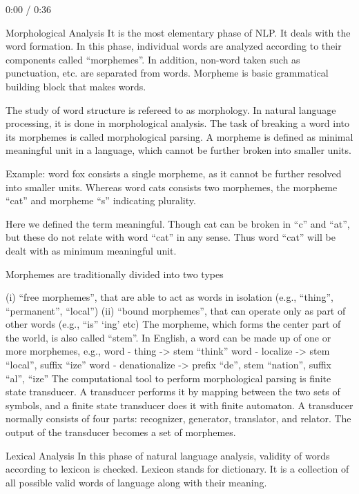 0:00
/ 0:36



Morphological Analysis
It is the most elementary phase of NLP. It deals with the word formation. In this phase, individual words are analyzed according to their components called “morphemes”. In addition, non-word taken such as punctuation, etc. are separated from words. Morpheme is basic grammatical building block that makes words.



The study of word structure is refereed to as morphology. In natural language processing, it is done in morphological analysis. The task of breaking a word into its morphemes is called morphological parsing. A morpheme is defined as minimal meaningful unit in a language, which cannot be further broken into smaller units.

Example: word fox consists a single morpheme, as it cannot be further resolved into smaller units. Whereas word cats consists two morphemes, the morpheme “cat” and morpheme “s” indicating plurality.

Here we defined the term meaningful. Though cat can be broken in “c” and “at”, but these do not relate with word “cat” in any sense. Thus word “cat” will be dealt with as minimum meaningful unit.

Morphemes are traditionally divided into two types

(i) “free morphemes”, that are able to act as words in isolation (e.g., “thing”, “permanent”, “local”)
(ii) “bound morphemes”, that can operate only as part of other words (e.g., “is” ‘ing’ etc) The morpheme, which forms the center part of the world, is also called “stem”. In English, a word can be made up of one or more morphemes, e.g.,
word - thing           -> stem “think”
word - localize        -> stem “local”, suffix “ize”
word - denationalize   -> prefix “de”, stem “nation”, suffix “al”, “ize”
The computational tool to perform morphological parsing is finite state transducer. A transducer performs it by mapping between the two sets of symbols, and a finite state transducer does it with finite automaton. A transducer normally consists of four parts: recognizer, generator, translator, and relator. The output of the transducer becomes a set of morphemes.

Lexical Analysis
In this phase of natural language analysis, validity of words according to lexicon is checked. Lexicon stands for dictionary. It is a collection of all possible valid words of language along with their meaning.


